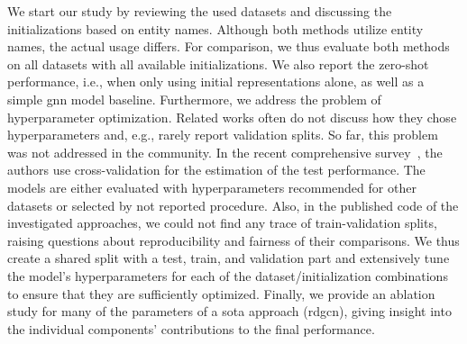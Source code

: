 \documentclass[runningheads]{llncs}
\begin{document}
We start our study by reviewing the used datasets and discussing the initializations based on entity names.
Although both methods utilize entity names, the actual usage differs.
For comparison, we thus evaluate both methods on all datasets with all available initializations.
We also report the zero-shot performance, i.e., when only using initial representations alone, as well as a simple \gls{gnn} model baseline.
Furthermore, we address the problem of hyperparameter optimization. 
Related works often do not discuss how they chose hyperparameters and, e.g., rarely report validation splits. So far, this problem was not addressed in the community. In the recent comprehensive survey~\cite{DBLP:journals/pvldb/SunZHWCAL20}, the authors use cross-validation for the estimation of the test performance. The models are either evaluated with hyperparameters recommended for other datasets or selected by not reported procedure.
Also, in the published code of the investigated approaches, we could not find any trace of train-validation splits, raising questions about reproducibility and fairness of their comparisons.
We thus create a shared split with a test, train, and validation part and extensively tune the model's hyperparameters for each of the dataset/initialization combinations to ensure that they are sufficiently optimized.
Finally, we provide an ablation study for many of the parameters of a \gls{sota} approach (\acrshort{rdgcn}), giving insight into the individual components' contributions to the final performance.
\end{document}
